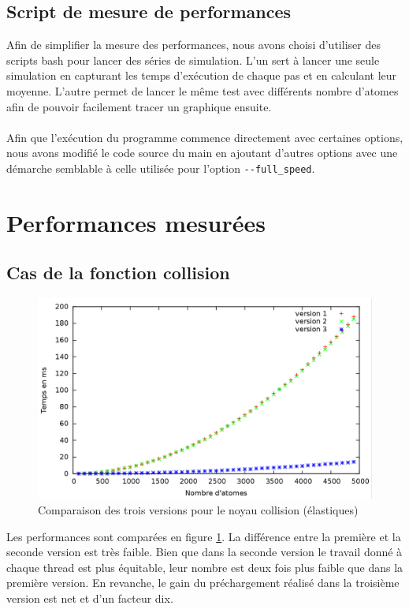 \documentclass{article}
\begin{document}
\subsection{Script de mesure de performances}
Afin de simplifier la mesure des performances, nous avons choisi d'utiliser des
scripts bash pour lancer des séries de simulation. L'un sert à lancer une seule
simulation en capturant les temps d'exécution de chaque pas et en calculant leur
moyenne. L'autre permet de lancer le même test avec différents nombre d'atomes
afin de pouvoir facilement tracer un graphique ensuite.
\paragraph{}
Afin que l'exécution du programme commence directement avec certaines options,
nous avons modifié le code source du main en ajoutant d'autres options avec une
démarche semblable à celle utilisée pour l'option \verb!--full_speed!.

\section{Performances mesurées}

\subsection{Cas de la fonction collision}
\begin{figure}[h]
	\caption{Comparaison des trois versions pour le noyau collision (élastiques)}
	\label{collisions}
	\includegraphics[width=\textwidth]{figures/collision.png}
\end{figure}

Les performances sont comparées en figure \ref{collisions}. La différence entre la première et la seconde version est très faible. Bien
que dans la seconde version le travail donné à chaque thread est plus
équitable, leur nombre est deux fois plus faible que dans la première version.
En revanche, le gain du préchargement réalisé dans la troisième version est
net et d'un facteur dix.
\end{document}
